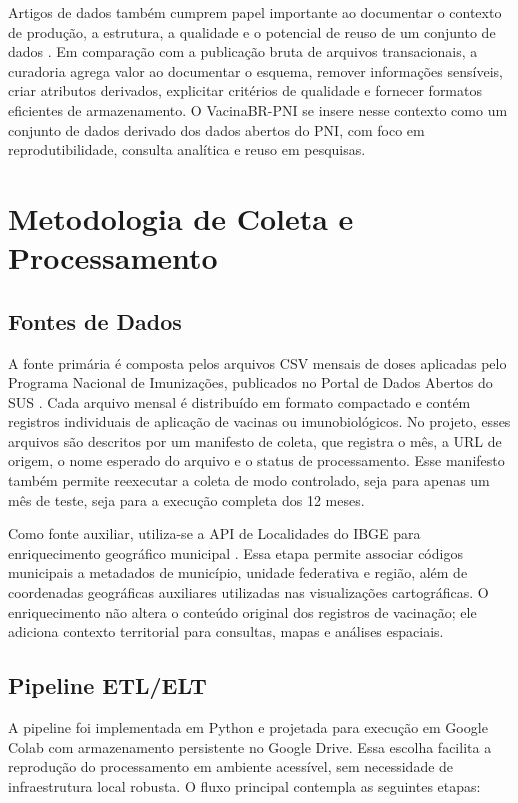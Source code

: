 \documentclass[12pt]{article}
\begin{document}
Artigos de dados também cumprem papel importante ao documentar o contexto de produção, a estrutura, a qualidade e o potencial de reuso de um conjunto de dados \cite{chavan2011data}. Em comparação com a publicação bruta de arquivos transacionais, a curadoria agrega valor ao documentar o esquema, remover informações sensíveis, criar atributos derivados, explicitar critérios de qualidade e fornecer formatos eficientes de armazenamento. O VacinaBR-PNI se insere nesse contexto como um conjunto de dados derivado dos dados abertos do PNI, com foco em reprodutibilidade, consulta analítica e reuso em pesquisas.

\section{Metodologia de Coleta e Processamento}

\subsection{Fontes de Dados}

A fonte primária é composta pelos arquivos CSV mensais de doses aplicadas pelo Programa Nacional de Imunizações, publicados no Portal de Dados Abertos do SUS \cite{datasus_pni_2025}. Cada arquivo mensal é distribuído em formato compactado e contém registros individuais de aplicação de vacinas ou imunobiológicos. No projeto, esses arquivos são descritos por um manifesto de coleta, que registra o mês, a URL de origem, o nome esperado do arquivo e o status de processamento. Esse manifesto também permite reexecutar a coleta de modo controlado, seja para apenas um mês de teste, seja para a execução completa dos 12 meses.

Como fonte auxiliar, utiliza-se a API de Localidades do IBGE para enriquecimento geográfico municipal \cite{ibge_localidades}. Essa etapa permite associar códigos municipais a metadados de município, unidade federativa e região, além de coordenadas geográficas auxiliares utilizadas nas visualizações cartográficas. O enriquecimento não altera o conteúdo original dos registros de vacinação; ele adiciona contexto territorial para consultas, mapas e análises espaciais.

\subsection{Pipeline ETL/ELT}

A pipeline foi implementada em Python e projetada para execução em Google Colab com armazenamento persistente no Google Drive. Essa escolha facilita a reprodução do processamento em ambiente acessível, sem necessidade de infraestrutura local robusta. O fluxo principal contempla as seguintes etapas:
\end{document}
